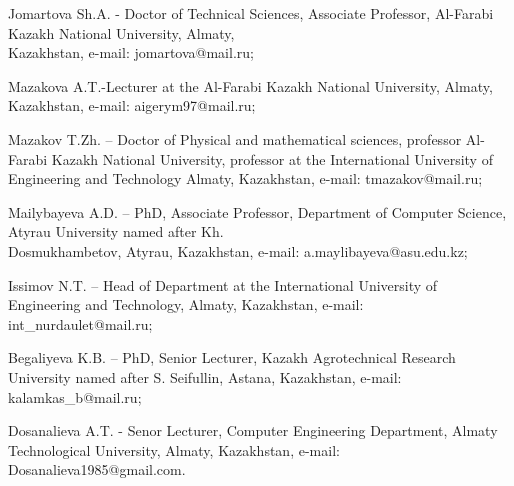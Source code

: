 \begin{authorinfo}
Jomartova Sh.A. - Doctor of Technical Sciences, Associate Professor,
Al-Farabi Kazakh National University, Almaty, \\Kazakhstan, e-mail:
jomartova@mail.ru;

Mazakova A.T.-Lecturer at the Al-Farabi Kazakh National University,
Almaty, Kazakhstan, e-mail: aigerym97@mail.ru;

Mazakov T.Zh. -- Doctor of Physical and mathematical sciences, professor
Al-Farabi Kazakh National University, professor at the International
University of Engineering and Technology Almaty, Kazakhstan, e-mail:
tmazakov@mail.ru;

Mailybayeva A.D. -- PhD, Associate Professor, Department of Computer
Science, Atyrau University named after Kh. \\Dosmukhambetov, Atyrau,
Kazakhstan, e-mail: a.maylibayeva@asu.edu.kz;

Issimov N.T. -- Head of Department at the International University of
Engineering and Technology, Almaty, Kazakhstan, e-mail:
int\_nurdaulet@mail.ru;

Begaliyeva K.B. -- PhD, Senior Lecturer, Kazakh Agrotechnical Research
University named after S. Seifullin, Astana, Kazakhstan, e-mail:
kalamkas\_b@mail.ru;

Dosanalieva A.T. - Senor Lecturer, Computer Engineering Department,
Almaty Technological University, Almaty, Kazakhstan, e-mail:
Dosanalieva1985@gmail.com.
\end{authorinfo}

